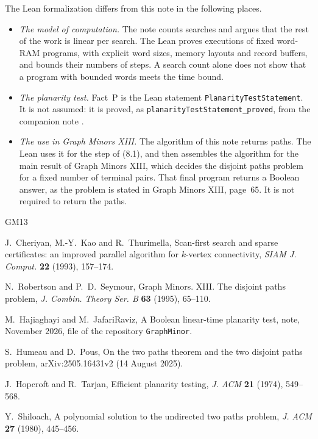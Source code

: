 \documentclass[11pt]{article}
\begin{document}
The Lean formalization differs from this note in the following places.
\begin{itemize}[nosep]
\item \emph{The model of computation.} The note counts searches and argues
that the rest of the work is linear per search. The Lean proves executions of
fixed word-RAM programs, with explicit word sizes, memory layouts and record
buffers, and bounds their numbers of steps. A search count alone does not show
that a program with bounded words meets the time bound.
\item \emph{The planarity test.} Fact~P is the Lean statement
\texttt{PlanarityTestStatement}. It is not assumed: it is proved, as
\texttt{planarityTestStatement\_proved}, from the companion note \cite{HJ26}.
\item \emph{The use in Graph Minors XIII.} The algorithm of this note returns
paths. The Lean uses it for the step of (8.1), and then assembles the
algorithm for the main result of Graph Minors XIII, which decides the disjoint
paths problem for a fixed number of terminal pairs. That final program returns
a Boolean answer, as the problem is stated in Graph Minors XIII, page~65. It is
not required to return the paths.
\end{itemize}

{\small
\begin{thebibliography}{GM13}

J.~Cheriyan, M.-Y.~Kao and R.~Thurimella,
Scan-first search and sparse certificates: an improved parallel algorithm for
$k$-vertex connectivity,
\emph{SIAM J. Comput.} \textbf{22} (1993), 157--174.

N.~Robertson and P.~D.~Seymour,
Graph Minors. XIII. The disjoint paths problem,
\emph{J. Combin. Theory Ser. B} \textbf{63} (1995), 65--110.

M.~Hajiaghayi and M.~JafariRaviz,
A Boolean linear-time planarity test,
note, November 2026, file  of the
repository \texttt{GraphMinor}.

S.~Humeau and D.~Pous,
On the two paths theorem and the two disjoint paths problem,
arXiv:2505.16431v2 (14 August 2025).

J.~Hopcroft and R.~Tarjan,
Efficient planarity testing,
\emph{J. ACM} \textbf{21} (1974), 549--568.

Y.~Shiloach,
A polynomial solution to the undirected two paths problem,
\emph{J. ACM} \textbf{27} (1980), 445--456.

\end{thebibliography}}
\end{document}

